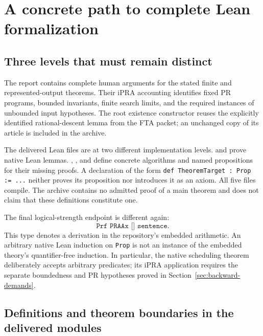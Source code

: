 \section{A concrete path to complete Lean formalization}
\label{sec:formalization}

\subsection{Three levels that must remain distinct}

The report contains complete human arguments for the stated finite and
represented-output theorems. Their iPRA accounting identifies fixed PR
programs, bounded invariants, finite search limits, and the required
instances of unbounded input hypotheses. The root existence constructor
reuses the explicitly identified rational-descent lemma from the FTA
packet; an unchanged copy of its article is included in the archive.

The delivered Lean files are at two different implementation levels.
 and  prove
native Lean lemmas. ,
, and  define
concrete algorithms and named propositions for their missing proofs.
A declaration of the form \texttt{def TheoremTarget : Prop := ...}
neither proves its proposition nor introduces it as an axiom.
All five files compile. The archive contains no admitted proof of a
main theorem and does not claim that these definitions constitute one.

The final logical-strength endpoint is different again:
\[
                  \texttt{Prf PRAAx [] sentence}.
\]
This type denotes a derivation in the repository's embedded arithmetic.
An arbitrary native Lean induction on \texttt{Prop} is not an instance
of the embedded theory's quantifier-free induction. In particular,
the native scheduling theorem deliberately accepts arbitrary predicates;
its iPRA application requires the separate boundedness and PR hypotheses
proved in Section~\ref{sec:backward-demands}.

\subsection{Definitions and theorem boundaries in the delivered modules}

